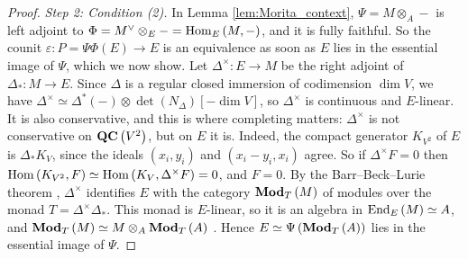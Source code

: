 \begin{proof}
\emph{Step 2: Condition (2).}
In Lemma \ref{lem:Morita_context}, $\Psi = M\otimes_A-$ is left adjoint to
$\Phi = M^\vee\otimes_E- = \operatorname{Hom}_E\left(M,-\right)$, and it is fully faithful. So the counit
$\varepsilon\colon P=\Psi\Phi\left(E\right)\to E$ is an equivalence as soon as $E$ lies in the
essential image of $\Psi$, which we now show.
Let $\Delta^\times\colon E\to M$ be the right adjoint of $\Delta_*\colon M\to E$. Since $\Delta$ is a
regular closed immersion of codimension $\dim V$, we have
$\Delta^\times\simeq\Delta^*\left(-\right)\otimes\det\left(N_\Delta\right)\left[-\dim V\right]$, so $\Delta^\times$
is continuous and $E$-linear.
It is also conservative, and this is where completing matters: $\Delta^\times$ is not
conservative on $\mathbf{QC}\left(V^2\right)$, but on $E$ it is. Indeed, the compact generator
$K_{V^2}$ of $E$ is $\Delta_*K_V$, since the ideals $\left(x_i,y_i\right)$ and
$\left(x_i-y_i,x_i\right)$ agree. So if $\Delta^\times F = 0$ then
$\operatorname{Hom}\left(K_{V^2},F\right)\simeq\operatorname{Hom}\left(K_V,\Delta^\times F\right)=0$, and $F=0$.
By the Barr--Beck--Lurie theorem \cite[Theorem 4.7.3.5]{L:HA}, $\Delta^\times$ identifies $E$ with
the category $\mathbf{Mod}_T\left(M\right)$ of modules over the monad $T=\Delta^\times\Delta_*$. This monad
is $E$-linear, so it is an algebra in $\operatorname{End}_E\left(M\right)\simeq A$, and
$\mathbf{Mod}_T\left(M\right)\simeq M\otimes_A\mathbf{Mod}_T\left(A\right)$ \cite[Theorem 4.8.4.6]{L:HA}.
Hence $E\simeq\Psi\left(\mathbf{Mod}_T\left(A\right)\right)$ lies in the essential image of $\Psi$.
\end{proof}

